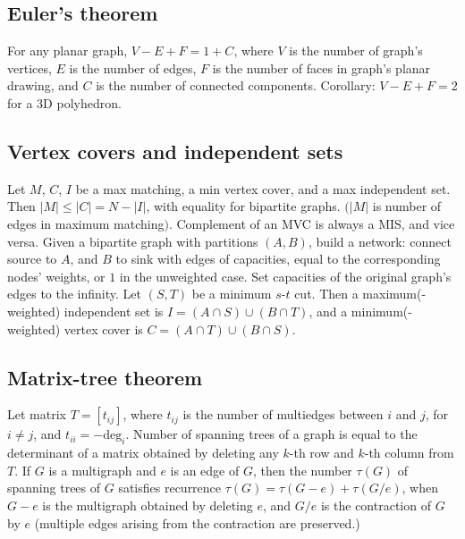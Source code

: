 \documentclass[12pt]{extarticle}
\begin{document}
\begin{multicols*}{2}
\subsection{Euler's theorem} For any planar graph, $V - E + F = 1 + C$,
where $V$ is the number of graph's vertices, $E$ is the number of edges,
$F$ is the number of faces in graph's planar drawing, and $C$ is the number
of connected components.  Corollary: $V - E + F = 2$ for a 3D polyhedron.


\subsection{Vertex covers and independent sets}
Let $M$, $C$, $I$ be a max matching, a min vertex cover, and a max independent set.
Then $|M| \le |C| = N - |I|$, with equality for bipartite graphs.
$(|M|$ is number of edges in maximum matching$)$.
Complement of an MVC is always a MIS, and vice versa.
Given a bipartite graph with partitions $(A, B)$, build a network:
connect source to $A$, and $B$ to sink with edges of capacities, equal to
the corresponding nodes' weights, or $1$ in the unweighted case.
Set capacities of the original graph's edges to the infinity.
Let $(S,T)$ be a minimum $s$-$t$ cut.
Then a maximum(-weighted) independent set is $I = (A \cap S) \cup (B \cap T)$,
and a minimum(-weighted) vertex cover is $C = (A \cap T) \cup (B \cap S)$.

\subsection{Matrix-tree theorem}
Let matrix $T = [t_{ij}]$, where $t_{ij}$ is the number of multiedges
between $i$ and $j$, for $i \ne j$, and $t_{ii} = -\mbox{deg}_i$.
Number of spanning trees of a graph is equal to the determinant of
a matrix obtained by deleting any $k$-th row and $k$-th column from $T$.
If $G$ is a multigraph and $e$ is an edge of $G$, then the number $\tau(G)$ of
spanning trees of $G$ satisfies recurrence $\tau(G) = \tau(G-e) + \tau(G/e)$,
when $G-e$ is the multigraph obtained by deleting $e$, and $G/e$ is
the contraction of $G$ by $e$ (multiple edges arising from the contraction
are preserved.)


\end{multicols*}
\end{document}
